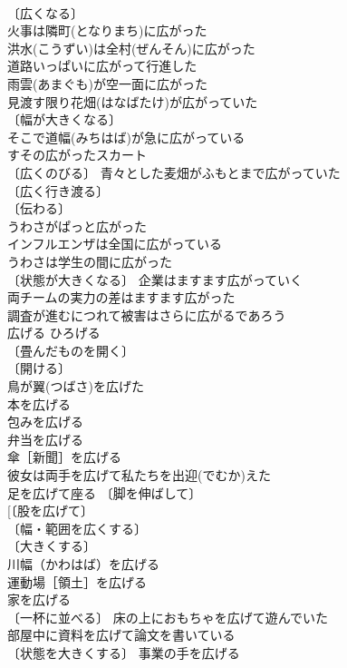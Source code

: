 \documentclass[8pt]{extreport}
\begin{document}
\begin{CJK}{UTF8}{min}
\\	〔広くなる〕
\\	火事は隣町(となりまち)に広がった 
\\	洪水(こうずい)は全村(ぜんそん)に広がった 
\\	道路いっぱいに広がって行進した 
\\	雨雲(あまぐも)が空一面に広がった 
\\	見渡す限り花畑(はなばたけ)が広がっていた 
\\	〔幅が大きくなる〕
\\	そこで道幅(みちはば)が急に広がっている 
\\	すその広がったスカート 
\\	〔広くのびる〕 青々とした麦畑がふもとまで広がっていた 
\\	〔広く行き渡る〕
\\	〔伝わる〕
\\	うわさがぱっと広がった 
\\	インフルエンザは全国に広がっている 
\\	うわさは学生の間に広がった 
\\	〔状態が大きくなる〕 企業はますます広がっていく 
\\	両チームの実力の差はますます広がった 
\\	調査が進むにつれて被害はさらに広がるであろう 
\\	広げる	ひろげる	
\\	〔畳んだものを開く〕
\\	〔開ける〕
\\	鳥が翼(つばさ)を広げた 
\\	本を広げる 
\\	包みを広げる 
\\	弁当を広げる 
\\	傘［新聞］を広げる 
\\	彼女は両手を広げて私たちを出迎(でむか)えた 
\\	足を広げて座る 〔脚を伸ばして〕
\\	[〔股を広げて〕
\\	〔幅・範囲を広くする〕
\\	〔大きくする〕
\\	川幅（かわはば）を広げる 
\\	運動場［領土］を広げる 
\\	家を広げる 
\\	〔一杯に並べる〕 床の上におもちゃを広げて遊んでいた 
\\	部屋中に資料を広げて論文を書いている 
\\	〔状態を大きくする〕 事業の手を広げる 

\end{CJK}
\end{document}
